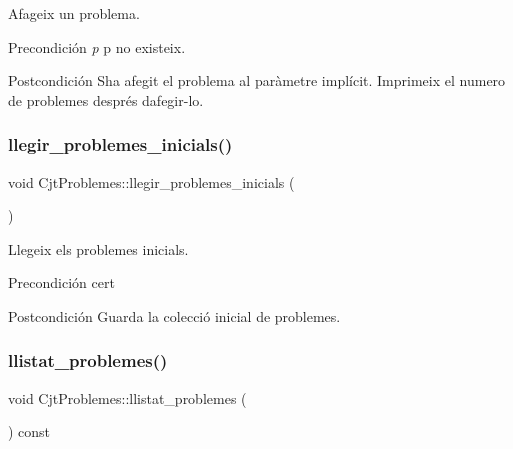 Afageix un problema. 

\begin{DoxyPrecond}{Precondición}
{\itshape p} p no existeix. 
\end{DoxyPrecond}
\begin{DoxyPostcond}{Postcondición}
S\textquotesingle{}ha afegit el problema al paràmetre implícit. Imprimeix el numero de problemes després d\textquotesingle{}afegir-\/lo. 
\end{DoxyPostcond}
\mbox{\label{class_cjt_problemes_ac320f52e566402ed341d2f67176be14a}} 
\subsubsection{\texorpdfstring{llegir\+\_\+problemes\+\_\+inicials()}{llegir\_problemes\_inicials()}}
{\footnotesize\ttfamily void Cjt\+Problemes\+::llegir\+\_\+problemes\+\_\+inicials (\begin{DoxyParamCaption}{ }\end{DoxyParamCaption})}



Llegeix els problemes inicials. 

\begin{DoxyPrecond}{Precondición}
cert 
\end{DoxyPrecond}
\begin{DoxyPostcond}{Postcondición}
Guarda la colecció inicial de problemes. 
\end{DoxyPostcond}
\mbox{\label{class_cjt_problemes_a4f47e1d0800f32093efa7569f58d8105}} 
\subsubsection{\texorpdfstring{llistat\+\_\+problemes()}{llistat\_problemes()}}
{\footnotesize\ttfamily void Cjt\+Problemes\+::llistat\+\_\+problemes (\begin{DoxyParamCaption}{ }\end{DoxyParamCaption}) const}



